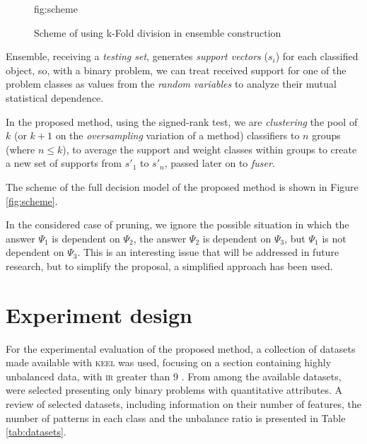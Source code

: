 \documentclass[pmlr]{jmlr}
\begin{document}
\begin{figure}[!h]
\floatconts
  {fig:scheme}
  {\caption{Scheme of using k-Fold division in ensemble construction}}
  {}
\end{figure}

Ensemble, receiving a \emph{testing set}, generates \emph{support vectors} ($s_i$) for each classified object, so, with a binary problem, we can treat received support for one of the problem classes as values from the \emph{random variables} to analyze their mutual statistical dependence.

In the proposed method, using the signed-rank test, we are \emph{clustering} the pool of $k$ (or $k+1$ on the \emph{oversampling} variation of a method) classifiers to $n$ groups (where $n\leq k$), to average the support and weight classes within groups to create a new set of supports from $s'_1$ to $s'_n$, passed later on to \emph{fuser}.

The scheme of the full decision model of the proposed method is shown in Figure \ref{fig:scheme}.

\begin{note}
In the considered case of pruning, we ignore the possible situation in which the answer $\Psi_1$ is dependent on $\Psi_2$, the answer $\Psi_2$ is dependent on $ \Psi_3$, but $\Psi_1$ is not dependent on $\Psi_3$. This is an interesting issue that will be addressed in future research, but to simplify the proposal, a simplified approach has been used.
\end{note}

\section{Experiment design}
\label{sec:intro}

For the experimental evaluation of the proposed method, a collection of datasets made available with \textsc{keel} \citep{alcala2011keel} was used, focusing on a section containing highly unbalanced data, with \textsc{ir} greater than 9 \citep{fernandez2009hierarchical}. From among the available datasets,  were selected presenting only binary problems with quantitative attributes. A review of selected datasets, including information on their number of features, the number of patterns in each class and the unbalance ratio is presented in Table \ref{tab:datasets}.
\end{document}
